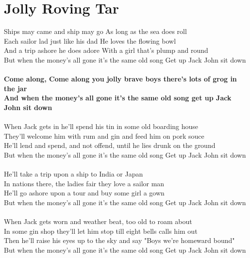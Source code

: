 \documentclass[letterpaper,9pt]{article}
\begin{document}
\newpage
\section{Jolly Roving Tar}
\noindent
Ships may came and ship may go As long as the sea does roll
\\Each sailor lad just like his dad He loves the flowing bowl
\\And a trip ashore he does adore With a girl that's plump and round 
\\But when the money's all gone it's the same old song Get up Jack John sit down
\\
\large
\\\textbf{Come along, Come along you jolly brave boys there’s lots of grog in the jar
\\And when the money's all gone it's the same old song get up Jack John sit down}
\\
\Large
\\When Jack gets in he'll spend his tin in some old boarding house
\\They'll welcome him with rum and gin and feed him on pork souce
\\He'll lend and spend, and not offend, until he lies drunk on the ground
\\But when the money's all gone it's the same old song Get up Jack John sit down
\\
\\He'll take a trip upon a ship to India or Japan
\\In nations there, the ladies fair they love a sailor man
\\He'll go ashore upon a tour and buy some girl a gown
\\But when the money's all gone it's the same old song Get up Jack John sit down
\\
\\When Jack gets worn and weather beat, too old to roam about
\\In some gin shop they'll let him stop till eight bells calls him out
\\Then he'll raise his eyes up to the sky and say "Boys we're homeward bound"
\\But when the money's all gone it's the same old song Get up Jack John sit down

\newpage
\end{document}
